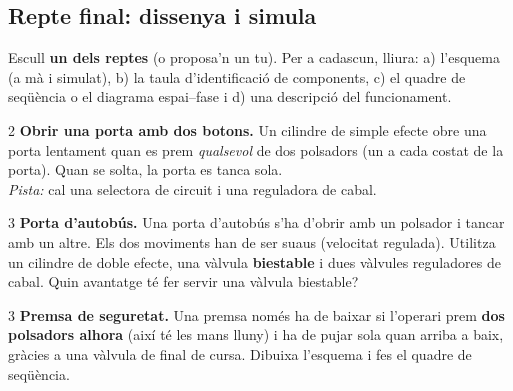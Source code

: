 \subsection*{Repte final: dissenya i simula}

Escull \textbf{un dels reptes} (o proposa'n un tu). Per a cadascun, lliura: a) l'esquema (a mà i simulat), b) la taula d'identificació de components, c) el quadre de seqüència o el diagrama espai--fase i d) una descripció del funcionament.

\begin{exercici}{2}
\textbf{Obrir una porta amb dos botons.} Un cilindre de simple efecte obre una porta lentament quan es prem \emph{qualsevol} de dos polsadors (un a cada costat de la porta). Quan se solta, la porta es tanca sola.\\
\emph{Pista:} cal una selectora de circuit i una reguladora de cabal.
\end{exercici}

\begin{exercici}{3}
\textbf{Porta d'autobús.} Una porta d'autobús s'ha d'obrir amb un polsador i tancar amb un altre. Els dos moviments han de ser suaus (velocitat regulada). Utilitza un cilindre de doble efecte, una vàlvula \textbf{biestable} i dues vàlvules reguladores de cabal. Quin avantatge té fer servir una vàlvula biestable?
\end{exercici}

\begin{exercici}{3}
\textbf{Premsa de seguretat.} Una premsa només ha de baixar si l'operari prem \textbf{dos polsadors alhora} (així té les mans lluny) i ha de pujar sola quan arriba a baix, gràcies a una vàlvula de final de cursa. Dibuixa l'esquema i fes el quadre de seqüència.
\end{exercici}

